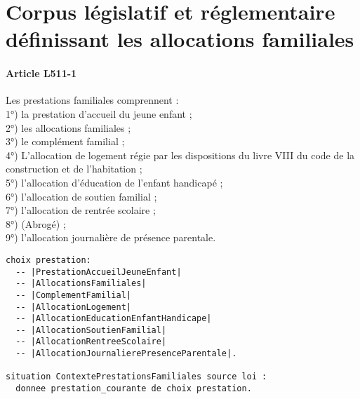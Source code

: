 \documentclass[11pt, french]{article}
\begin{document}
\section{Corpus législatif et réglementaire définissant les allocations familiales}

\paragraph{Article L511-1} Les prestations familiales comprennent :\\
1°) la prestation d'accueil du jeune enfant ;\\
2°) les allocations familiales ;\\
3°) le complément familial ;\\
4°) L'allocation de logement régie par les dispositions du livre VIII du code de la construction et de l'habitation ;\\
5°) l'allocation d'éducation de l'enfant handicapé ;\\
6°) l'allocation de soutien familial ;\\
7°) l'allocation de rentrée scolaire ;\\
8°) (Abrogé) ;\\
9°) l'allocation journalière de présence parentale.
\begin{lstlisting}
choix prestation:
  -- |PrestationAccueilJeuneEnfant|
  -- |AllocationsFamiliales|
  -- |ComplementFamilial|
  -- |AllocationLogement|
  -- |AllocationEducationEnfantHandicape|
  -- |AllocationSoutienFamilial|
  -- |AllocationRentreeScolaire|
  -- |AllocationJournalierePresenceParentale|.

situation ContextePrestationsFamiliales source loi :
  donnee prestation_courante de choix prestation.
\end{lstlisting}
\end{document}
